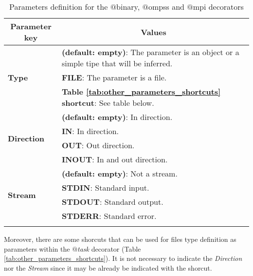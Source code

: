 \bgroup
  \def\arraystretch{1.5}%
  \begin{longtable}{| p{} | p{} |}
    \hline
    \multicolumn{1}{|c|}{{\bf Parameter key}} &  \multicolumn{1}{c|}{{\bf Values }}\\
    \hline
        \multirow{3}{*}{{\bf Type}} & {\bf (default: empty)}: The parameter is an object or a simple tipe that will be inferred. \\
                                    & {\bf FILE}: The parameter is a file. \\
                                    & {\bf Table \ref{tab:other_parameters_shortcuts} shortcut}: See table below.\\
    \hline
        \multirow{4}{*}{{\bf Direction}} & {\bf (default: empty)}: In direction. \\
                                         & {\bf IN}: In direction. \\
                                         & {\bf OUT}: Out direction. \\
                                         & {\bf INOUT}: In and out direction. \\
    \hline
        \multirow{4}{*}{{\bf Stream}} & {\bf (default: empty)}: Not a stream. \\
                                      & {\bf STDIN}: Standard input. \\
                                      & {\bf STDOUT}: Standard output. \\
                                      & {\bf STDERR}: Standard error. \\
    \hline
     \caption{Parameters definition for the $@$binary, $@$ompss and $@$mpi decorators}
    \label{tab:other_parameters}
  \end{longtable}
\egroup

Moreover, there are some shorcuts that can be used for files type definition as parameters within the {\it $@$task} decorator (Table \ref{tab:other_parameters_shortcuts}).
It is not necessary to indicate the {\it Direction} nor the {\it Stream} since it may be already be indicated with the shorcut.

